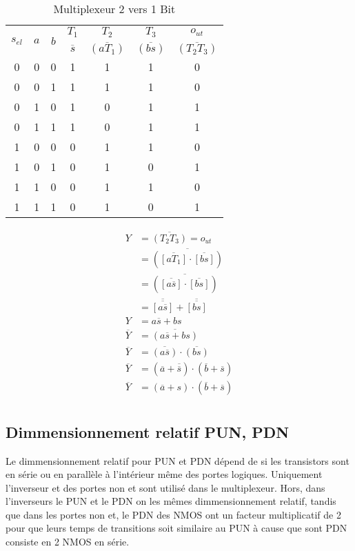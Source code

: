 \documentclass[a11paper]{article}
\newcommand{\quicktab}[4]{
  \begin{table}[H]
    \centering
    \caption{#1}
    \label{tab:#2}
    \begin{tabular}{#3}
      #4
    \end{tabular}
  \end{table}
}
\begin{document}
\begin{minipage}{0.48\textwidth}
\quicktab{Multiplexeur 2 vers 1 Bit}{mux2x1b}{ccccccc}{
  \toprule
  \multirow{2}{*}{$s_{el}$} &
  \multirow{2}{*}{$a$} &
  \multirow{2}{*}{$b$} &
  $T_1$ &
  $T_2$ &
  $T_3$ &
  $o_{ut}$ \\
  & & &
  $\overline{s}$ &
  $\overline{(aT_1)}$ &
  $\overline{(bs)}$ &
  $\overline{(T_2T_3)}$ \\
  \midrule
  0&0&0&1&1&1&0 \\
  0&0&1&1&1&1&0 \\
  0&1&0&1&0&1&1 \\
  0&1&1&1&0&1&1 \\
  1&0&0&0&1&1&0 \\
  1&0&1&0&1&0&1 \\
  1&1&0&0&1&1&0 \\
  1&1&1&0&1&0&1
  \\
  \bottomrule
}
\end{minipage}
\hfill
\begin{minipage}{0.48\textwidth}
\begin{align}
  Y &= \overline{(T_2T_3)} = o_{ut}  \\
  &= \overline{(\overline{[aT_1]}\cdot\overline{[bs]} )} \\
  &= \overline{(\overline{[a\overline{s}]}\cdot\overline{[bs]} )} \\
  &= \overline{\overline{[a\overline{s}]}} + \overline{\overline{[bs]}} \\
  Y &= a\overline{s} + bs \\
  \overline{Y} &= \overline{(a\overline{s} + bs)} \\
  \overline{Y} &= \overline{(a\overline{s})} \cdot \overline{(bs)} \\
  \overline{Y} &= (\overline{a}+\overline{\overline{s}}) \cdot (\overline{b}+\overline{s}) \\
  \overline{Y} &= (\overline{a}+s) \cdot (\overline{b}+\overline{s}) \\
\end{align}
\end{minipage}

\subsection{Dimmensionnement relatif PUN, PDN}
Le dimmensionnement relatif pour PUN et PDN dépend de si les transistors sont en série ou en parallèle à l'intérieur même des portes logiques. Uniquement l'inverseur et des portes
non et sont utilisé dans le multiplexeur. Hors, dans l'inverseurs le PUN et le PDN on les mêmes dimmensionnement relatif, tandis que dans les portes non et, le PDN des NMOS ont un
facteur multiplicatif de 2 pour que leurs temps de transitions soit similaire au PUN à cause que sont PDN consiste en 2 NMOS en série.
\end{document}

